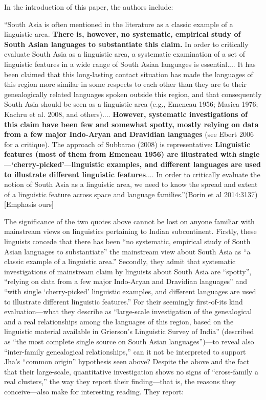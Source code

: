 In the introduction of this paper, the authors include:

\begin{myquote}
“South Asia is often mentioned in the literature as a classic example of a linguistic area. \textbf{There is, however, no systematic, empirical study of South Asian languages to substantiate this claim.} In order to critically evaluate South Asia as a linguistic area, a systematic examination of a set of linguistic features in a wide range of South Asian languages is essential.... It has been claimed that this long-lasting contact situation has made the languages of this region more similar in some respects to each other than they are to their genealogically related languages spoken outside this region, and that consequently South Asia should be seen as a linguistic area (e.g., Emeneau 1956; Masica 1976; Kachru et al. 2008, and others).... \textbf{However, systematic investigations of this claim have been few and somewhat spotty, mostly relying on data from a few major Indo-Aryan and Dravidian languages} (see Ebert 2006 for a critique). The approach of Subbarao (2008) is representative: \textbf{Linguistic features (most of them from Emeneau 1956) are illustrated with single}—\textbf{‘cherry-picked’}—\textbf{linguistic examples, and different languages are used to illustrate different linguistic features}.... In order to critically evaluate the notion of South Asia as a linguistic area, we need to know the spread and extent of a linguistic feature across space and language families.”\hfill (Borin et al 2014:3137) [Emphasis ours]
\end{myquote}

The significance of the two quotes above cannot be lost on anyone familiar with mainstream views on linguistics pertaining to Indian subcontinent. Firstly, these linguists concede that there has been “no systematic, empirical study of South Asian languages to substantiate” the mainstream view about South Asia as “a classic example of a linguistic area.” Secondly, they admit that systematic investigations of mainstream claim by linguists about South Asia are “spotty”, “relying on data from a few major Indo-Aryan and Dravidian languages” and “with single ‘cherry-picked’ linguistic examples, and different languages are used to illustrate different linguistic features.” For their seemingly first-of-its kind evaluation—what they describe as “large-scale investigation of the genealogical and a real relationships among the languages of this region, based on the linguistic material available in Grierson’s Linguistic Survey of India” (described as “the most complete single source on South Asian languages”)—to reveal also “inter-family genealogical relationships,” can it not be interpreted to support Jha’s “common origin” hypothesis seen above? Despite the above and the fact that their large-scale, quantitative investigation shows no signs of “cross-family a real clusters,” the way they report their finding—that is, the reasons they conceive—also make for interesting reading. They report:

